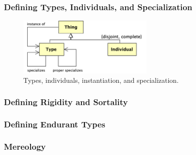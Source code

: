 \documentclass{article}
\newcommand{\BeginEndurantTaxonomyOfPropertiesBegin}{194}
\newcommand{\EndEndurantTaxonomyOfPropertiesEnd}{271}
\newcommand{\BeginInstantationAndSpecialzation}{273}
\newcommand{\EndInstantationAndSpecialzation}{356}
\newcommand{\BeginRigidityAndSortality}{360}
\newcommand{\EndRigidityAndSortality}{626}
\newcommand{\BeginEndurantsTypesDefinition}{628}
\newcommand{\EndEndurantsTypesDefinition}{835}
\begin{document}


\subsubsection{Defining Types, Individuals, and Specialization}

\begin{figure}[ht]
    \centering
    \includegraphics[width=0.6\textwidth]{diagrams/Instantiation_Diagram.png}
    \caption{Types, individuals, instantiation, and specialization.}
    \label{fig:instantiation_and_specialization}
\end{figure}



\subsubsection{Defining Rigidity and Sortality}



\subsubsection{Defining Endurant Types}



\subsubsection{Mereology}
\end{document}
